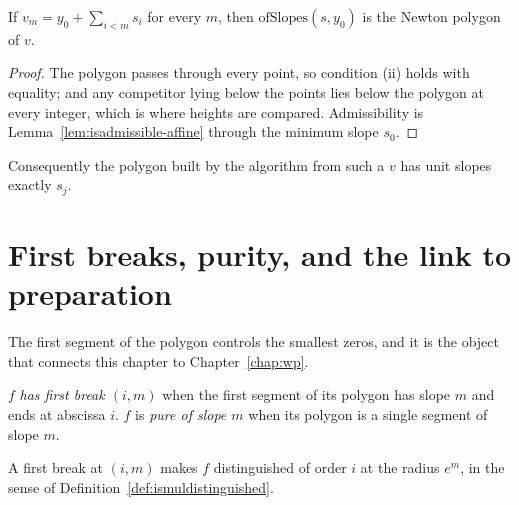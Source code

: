 \begin{theorem}
  \label{thm:ofslopes}
  \leanok
  If $v_m = y_0 + \sum_{i < m} s_i$ for every $m$, then $\mathrm{ofSlopes}(s, y_0)$ is the Newton
  polygon of $v$.
\end{theorem}

\begin{proof}
  \leanok
  The polygon passes through every point, so condition (ii) holds with equality; and any
  competitor lying below the points lies below the polygon at every integer, which is where
  heights are compared.  Admissibility is Lemma~\ref{lem:isadmissible-affine} through the minimum
  slope $s_0$.
\end{proof}

\begin{corollary}
  \label{cor:ofslopes-transport}
  \leanok
  Consequently the polygon built by the algorithm from such a $v$ has unit slopes exactly $s_j$.
\end{corollary}

\section{First breaks, purity, and the link to preparation}

The first segment of the polygon controls the smallest zeros, and it is the object that connects
this chapter to Chapter~\ref{chap:wp}.

\begin{definition}
  \label{def:hasfirstbreak}
  \leanok
  $f$ \emph{has first break $(i, m)$} when the first segment of its polygon has slope $m$ and
  ends at abscissa $i$.  $f$ is \emph{pure of slope $m$} when its polygon is a single segment of
  slope $m$.
\end{definition}

\begin{proposition}
  \label{prop:firstbreak-distinguished}
  \leanok
  A first break at $(i, m)$ makes $f$ distinguished of order $i$ at the radius $e^{m}$, in the
  sense of Definition~\ref{def:ismuldistinguished}.
\end{proposition}

